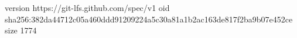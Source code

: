 version https://git-lfs.github.com/spec/v1
oid sha256:382da44712c05a460ddd91209224a5c30a81a1b2ac163de817f2ba9b07e452ce
size 1774
